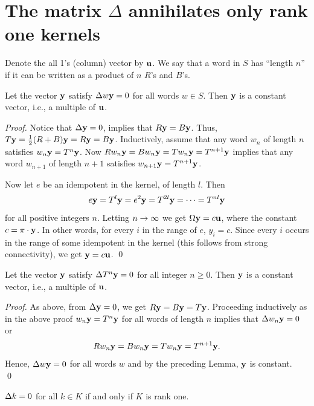 

\section{The matrix $\Delta$ annihilates only rank one kernels}  %


Denote the all 1's (column) vector by $\mathbf u$. 
We say that a word in $S$ has ``length $n$'' if it can be written as a product of $n$ $R$'s and $B$'s.


\begin{lemma} 		\label{lem:5.1}
Let the vector $\mathbf y$ satisfy $\Delta w\mathbf y=0$ for all words  $w \in S$.
Then $\mathbf y$ is a constant vector, i.e., a multiple of $\mathbf u$.
\end{lemma}


\begin{proof}    Notice that  $\Delta\mathbf y=0$, implies that $R\mathbf y=B\mathbf y$. 
Thus,  $T\mathbf y = \frac{1}{2}(R+B)\mathbf y = R\mathbf y = B\mathbf y$.  
Inductively, assume that any word $w_n$  of length $n$ satisfies  $w_n\mathbf y=T^n\mathbf y$.  Now $Rw_n\mathbf y = Bw_n\mathbf y = Tw_n\mathbf y = T^{n+1}\mathbf y$  implies that any word $w_{n+1}$  of length $n+1$  satisfies  $w_{n+1}\mathbf y = T^{n+1}\mathbf y$.


Now let $e$ be an idempotent in the kernel, of length $l$. Then
\[
  e\mathbf y = T^l \mathbf y = e^2 \mathbf y = T^{2l} \mathbf y = \cdots = T^{nl} \mathbf y
\]
for all positive integers $n$. Letting  $n\to\infty$ we get $\Omega\mathbf y = c\mathbf u$, where the constant  $c = \pi \cdot \mathbf y$.  
In other words, for every $i$ in the range of $e$, $y_i = c$. 
Since every $i$ occurs in the range of some idempotent in the kernel (this follows from strong connectivity), we get $\mathbf y = c\mathbf u$.      
\qed
\end{proof}


\begin{corollary} 	\label{cor:5.1}
Let the vector $\mathbf y$ satisfy $\Delta T^n \mathbf y=0$  for all integer  $n \ge 0$.  
Then $\mathbf y$ is a constant vector, i.e., a multiple of $\mathbf u$.
\end{corollary}


\begin{proof}    As above, from $\Delta \mathbf y = 0$, we get  $R\mathbf y = B\mathbf y = T\mathbf y$. 
Proceeding inductively as in the above proof $w_n\mathbf y = T^n\mathbf y$  for all words of length $n$ implies that $\Delta w_n \mathbf y = 0$  or 
\[
  Rw_n \mathbf y = Bw_n \mathbf y = Tw_n \mathbf y = T^{n+1} \mathbf y.
\]
Hence, $\Delta w\mathbf y = 0$ for all words $w$ and by the preceding Lemma, $\mathbf y$ is constant.
\qed
\end{proof}


\begin{corollary}   	\label{cor:5.2}
$\Delta k = 0$ for all $k \in K$  if and only if $K$  is rank one.
\end{corollary}


